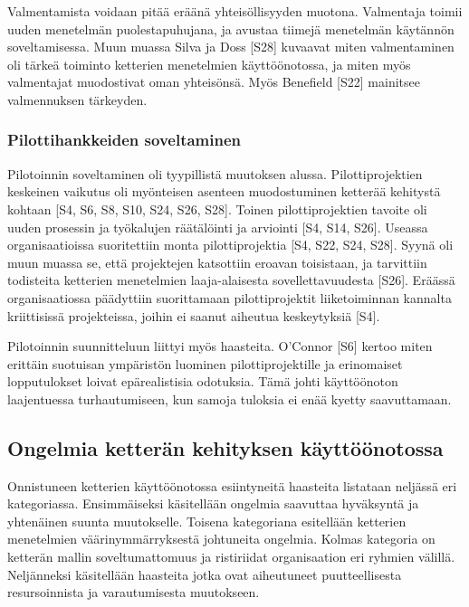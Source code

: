 Valmentamista voidaan pitää eräänä yhteisöllisyyden muotona. Valmentaja toimii
uuden menetelmän puolestapuhujana, ja avustaa tiimejä menetelmän käytännön
soveltamisessa. Muun muassa Silva ja Doss [S28] kuvaavat miten valmentaminen oli
tärkeä toiminto ketterien menetelmien käyttöönotossa, ja miten myös valmentajat
muodostivat oman yhteisönsä. Myös Benefield [S22] mainitsee valmennuksen
tärkeyden.

\subsubsection{Pilottihankkeiden soveltaminen}
\label{subsec:pilotointi}

Pilotoinnin soveltaminen oli tyypillistä muutoksen alussa. Pilottiprojektien
keskeinen vaikutus oli myönteisen asenteen muodostuminen ketterää kehitystä
kohtaan [S4, S6, S8, S10, S24, S26, S28]. Toinen pilottiprojektien tavoite oli
uuden prosessin ja työkalujen räätälöinti ja arviointi [S4, S14, S26].
Useassa organisaatioissa suoritettiin monta pilottiprojektia [S4, S22, S24,
S28]. Syynä oli muun muassa se, että projektejen katsottiin eroavan toisistaan,
ja tarvittiin todisteita ketterien menetelmien laaja-alaisesta
sovellettavuudesta [S26]. Eräässä organisaatiossa päädyttiin suorittamaan
pilottiprojektit liiketoiminnan kannalta kriittisissä projekteissa, joihin ei
saanut aiheutua keskeytyksiä [S4].

Pilotoinnin suunnitteluun liittyi myös haasteita. O'Connor [S6] kertoo miten
erittäin suotuisan ympäristön luominen pilottiprojektille ja erinomaiset
lopputulokset loivat epärealistisia odotuksia. Tämä johti käyttöönoton
laajentuessa turhautumiseen, kun samoja tuloksia ei enää kyetty saavuttamaan.

\subsection{Ongelmia ketterän kehityksen käyttöönotossa}

Onnistuneen ketterien käyttöönotossa esiintyneitä haasteita listataan neljässä
eri kategoriassa. Ensimmäiseksi käsitellään ongelmia saavuttaa hyväksyntä ja
yhtenäinen suunta muutokselle. Toisena kategoriana esitellään ketterien
menetelmien väärinymmärryksestä johtuneita ongelmia. Kolmas kategoria on
ketterän mallin soveltumattomuus ja ristiriidat organisaation eri ryhmien
välillä. Neljänneksi käsitellään haasteita jotka ovat aiheutuneet
puutteellisesta resursoinnista ja varautumisesta muutokseen.

